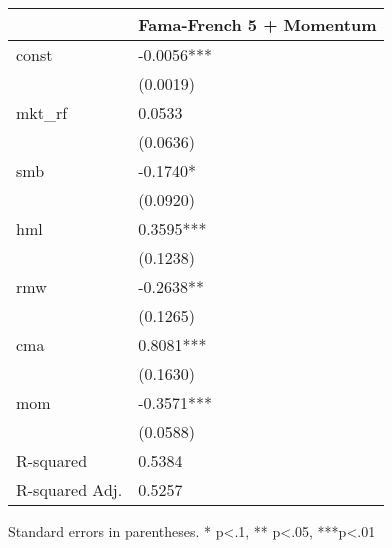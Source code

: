\begin{table}
\caption{}
\label{}
\begin{center}
\begin{tabular}{ll}
\hline
               & Fama-French 5 + Momentum  \\
\hline
const          & -0.0056***                \\
               & (0.0019)                  \\
mkt\_rf        & 0.0533                    \\
               & (0.0636)                  \\
smb            & -0.1740*                  \\
               & (0.0920)                  \\
hml            & 0.3595***                 \\
               & (0.1238)                  \\
rmw            & -0.2638**                 \\
               & (0.1265)                  \\
cma            & 0.8081***                 \\
               & (0.1630)                  \\
mom            & -0.3571***                \\
               & (0.0588)                  \\
R-squared      & 0.5384                    \\
R-squared Adj. & 0.5257                    \\
\hline
\end{tabular}
\end{center}
\end{table}
\bigskip
Standard errors in parentheses. \newline 
* p<.1, ** p<.05, ***p<.01